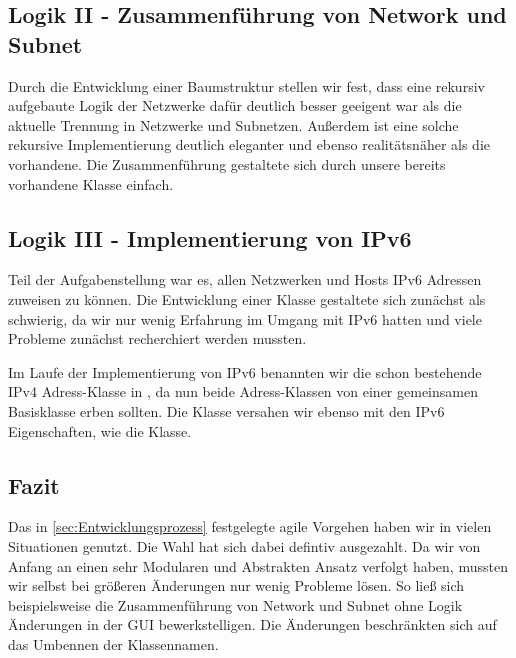 \subsection{Logik II - Zusammenführung von Network und Subnet}
Durch die Entwicklung einer Baumstruktur stellen wir fest, dass eine rekursiv aufgebaute Logik der
Netzwerke dafür deutlich besser geeigent war als die aktuelle Trennung in Netzwerke und Subnetzen.
Außerdem ist eine solche rekursive Implementierung deutlich eleganter und ebenso realitätsnäher
als die vorhandene.
Die Zusammenführung gestaltete sich durch unsere bereits vorhandene  Klasse einfach.

\subsection{Logik III - Implementierung von IPv6}
Teil der Aufgabenstellung war es, allen Netzwerken und Hosts IPv6 Adressen zuweisen zu können.
Die Entwicklung einer  Klasse gestaltete sich zunächst als schwierig, da wir nur
wenig Erfahrung im Umgang mit IPv6 hatten und viele Probleme zunächst recherchiert werden mussten.

Im Laufe der Implementierung von IPv6 benannten wir die schon bestehende IPv4 Adress-Klasse in ,
da nun beide Adress-Klassen von einer gemeinsamen Basisklasse  erben sollten.
Die  Klasse versahen wir ebenso mit den IPv6 Eigenschaften, wie die  Klasse.

\subsection{Fazit}
Das in \ref{sec:Entwicklungsprozess} festgelegte agile Vorgehen haben wir in vielen Situationen
genutzt. Die Wahl hat sich dabei defintiv ausgezahlt.
Da wir von Anfang an einen sehr Modularen und Abstrakten Ansatz verfolgt haben,
mussten wir selbst bei größeren Änderungen nur wenig Probleme lösen. So ließ sich beispielsweise
die Zusammenführung von Network und Subnet ohne Logik Änderungen in der GUI bewerkstelligen. Die
Änderungen beschränkten sich auf das Umbennen der Klassennamen.